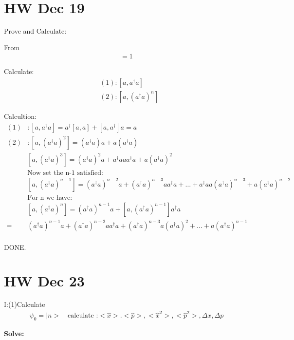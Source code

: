 \documentclass{article}
\begin{document}
  \newpage

  \section{HW Dec 19}

  Prove and Calculate:

  From
  \begin{align*}
    [a,a^{\dagger}]=1
  \end{align*}
  
  Calculate:
  \begin{align*}
    &(1):[a,a^{\dagger}a]\\
    &(2):[a,(a^{\dagger}a)^n]
  \end{align*}

  Calcultion:
  \begin{align*}
    (1)&:[a,a^{\dagger}a]=a^{\dagger}[a,a]+[a,a^{\dagger}]a=a\\
    (2)&:[a,(a^{\dagger}a)^2]=(a^{\dagger}a)a+a(a^{\dagger}a)\\
       &[a,(a^{\dagger}a)^3]=(a^{\dagger}a)^2a+a^{\dagger}aaa^{\dagger}a+a(a^{\dagger}a)^2\\
       &\text{Now set the n-1 satisfied:}\\
       &[a,(a^{\dagger}a)^{n-1}]=(a^{\dagger}a)^{n-2}a+(a^{\dagger}a)^{n-3}aa^{\dagger}a+\dots+a^{\dagger}aa(a^{\dagger}a)^{n-3}+a(a^{\dagger}a)^{n-2}\\
       &\text{For n we have:}\\
       &[a,(a^{\dagger}a)^n]=(a^{\dagger}a)^{n-1}a+[a,(a^{\dagger}a)^{n-1}]a^{\dagger}a\\
    =&(a^{\dagger}a)^{n-1}a+(a^{\dagger}a)^{n-2}aa^{\dagger}a+(a^{\dagger}a)^{n-3}a(a^{\dagger}a)^2+\dots+a(a^{\dagger}a)^{n-1}\\
  \end{align*}

  DONE.

  \newpage
  
  \section{HW Dec 23}

  I:(1)Calculate
  \begin{align}
    \psi_0=|n>\quad\text{calculate :}<\hat x>.<\hat p>,<\hat x^2>,<\hat p^2>,\Delta x,\Delta p
  \end{align}

  \textbf{Solve:}
\end{document}
